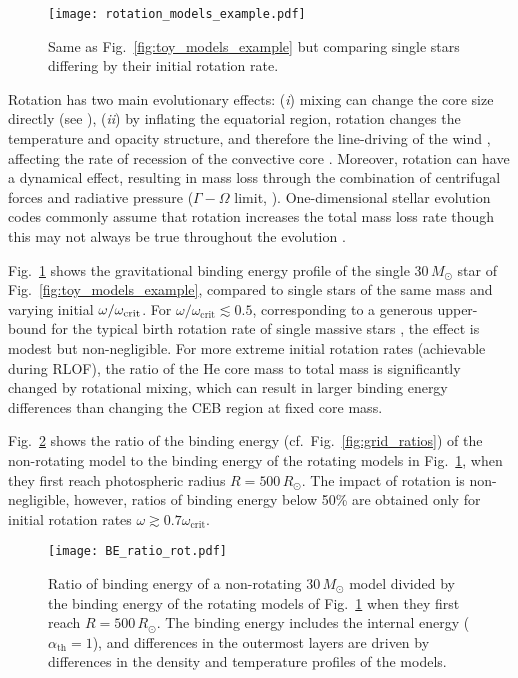 \documentclass[twocolumn,twocolappendix,trackchanges]{aastex63}
\DeclareRobustCommand{\Figref}[1]{Fig.~\ref{#1}}
\begin{document}
\begin{figure}[htbp]
  \centering
  \texttt{[image: rotation\_models\_example.pdf]}
  \caption{Same as \Figref{fig:toy_models_example} but comparing
    single stars differing by their initial rotation rate.}
  \label{fig:rotation_models_example}
\end{figure}

Rotation has two main evolutionary effects: (\emph{i}) mixing can change the core
size directly (see \citealt{heger:2000, maeder:00}), (\emph{ii}) by
inflating the equatorial region, rotation changes the temperature and
opacity structure, and therefore the line-driving of the wind
\cite[e.g.,][]{muller:2014, gagnier:2019}, affecting the
rate of recession of the convective core \citep[e.g.,][]{renzo:2017,
  renzo:2020ppi_conv}. Moreover, rotation can have a dynamical effect,
resulting in mass loss through the combination of centrifugal forces
and radiative pressure ($\Gamma-\Omega$ limit, \citealt{langer:1998}).
One-dimensional stellar evolution codes commonly assume that rotation
increases the total mass loss rate \citep[e.g.,][]{langer:1998,
  heger:2000} though this may not always be true throughout the
evolution \citep[e.g.,][]{gagnier:2019}.

\Figref{fig:rotation_models_example} shows the gravitational binding
energy profile of the single $30\,M_\odot$ star of
\Figref{fig:toy_models_example}, compared to single stars of the same
mass and varying initial $\omega/\omega_{\rm crit}$.
For $\omega/\omega_\mathrm{crit}\lesssim 0.5$, corresponding to a
generous upper-bound for the typical birth rotation rate of single
massive stars \citep[e.g.,][]{ramirez-agudelo:2015}, the effect is
modest but non-negligible. For more extreme initial rotation rates
(achievable during RLOF), the ratio of
the He core mass to total mass is significantly changed by rotational
mixing, which can result in larger binding energy differences than
changing the CEB region at fixed core mass.

\Figref{fig:BE_ratio_rot} shows the ratio of the binding energy
(cf.~\Figref{fig:grid_ratios}) of the non-rotating model to the
binding energy of the rotating models in
\Figref{fig:rotation_models_example}, when they first reach
photospheric radius $R=500\,R_\odot$. The impact of rotation is
non-negligible, however, ratios of binding energy below 50\% are
obtained only for initial rotation rates
$\omega \gtrsim 0.7\omega_\mathrm{crit}$.

\begin{figure}[htbp]
  \texttt{[image: BE\_ratio\_rot.pdf]}
  \caption{Ratio of binding energy of a
      non-rotating $30\,M_\odot$ model divided by the binding energy
      of the rotating models of \Figref{fig:rotation_models_example}
      when they first reach $R=500\,R_\odot$. The binding energy
      includes the internal energy ($\alpha_\mathrm{th}=1$), and
      differences in the outermost layers are driven by differences in
      the density and temperature profiles of the models.}
  \label{fig:BE_ratio_rot}
\end{figure}
\end{document}
